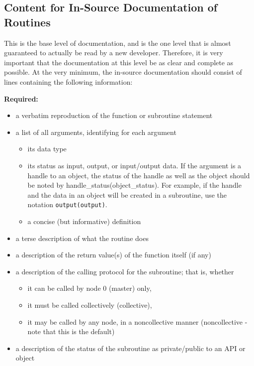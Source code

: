 \begin{itemize}
\begin{itemize}
\end{itemize}

\end{itemize}

\subsection{Content for In-Source Documentation of Routines}
\label{sec:content}

This is the base level of documentation, and is the one level that is almost
guaranteed to actually be read by a new developer.  Therefore, it is very
important that the documentation at this level be as clear and complete as
possible.  At the very minimum, the in-source documentation should consist of
lines containing the following information:

{\bf Required:}
\begin{itemize}
\item a verbatim reproduction of the function or subroutine statement
\item a list of all arguments, identifying for each argument
\begin{itemize}
\item its data type
\item its status as input, output, or input/output data.  If the argument is a
      handle to an object, the status of the handle as well as the object should
      be noted by handle\_status(object\_status).  For example, if the handle
      and the data in an object will be created in a subroutine, use the notation
      \verb+output(output)+.
\item a concise (but informative) definition
\end{itemize}
\item a terse description of what the routine does
\item a description of the return value(s) of the function itself (if any)
\item a description of the calling protocol for the subroutine; that is, whether
\begin{itemize}
\item it can be called by node 0 (master) only,
\item it must be called collectively (collective),
\item it may be called by any node,
      in a noncollective manner (noncollective - note that this is the default)
\end{itemize}
\item a description of the status of the subroutine as private/public to an API or object
\end{itemize}

